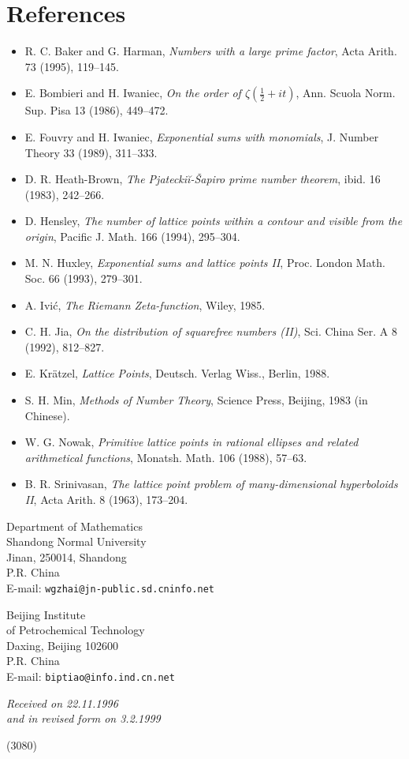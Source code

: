\documentclass[10pt]{article}
\begin{document}
\section*{References}
\begin{itemize}
  \item[] [1] R. C. Baker and G. Harman, \textit{Numbers with a large prime factor}, Acta Arith. 73 (1995), 119--145.
  \item[] [2] E. Bombieri and H. Iwaniec, \textit{On the order of $\zeta\left(\frac{1}{2}+i t\right)$}, Ann. Scuola Norm. Sup. Pisa 13 (1986), 449--472.
  \item[] [3] E. Fouvry and H. Iwaniec, \textit{Exponential sums with monomials}, J. Number Theory 33 (1989), 311--333.
  \item[] [4] D. R. Heath-Brown, \textit{The Pjateckiĭ-Šapiro prime number theorem}, ibid. 16 (1983), 242--266.
  \item[] [5] D. Hensley, \textit{The number of lattice points within a contour and visible from the origin}, Pacific J. Math. 166 (1994), 295--304.
  \item[] [6] M. N. Huxley, \textit{Exponential sums and lattice points II}, Proc. London Math. Soc. 66 (1993), 279--301.
  \item[] [7] A. Ivić, \textit{The Riemann Zeta-function}, Wiley, 1985.
  \item[] [8] C. H. Jia, \textit{On the distribution of squarefree numbers (II)}, Sci. China Ser. A 8 (1992), 812--827.
  \item[] [9] E. Krätzel, \textit{Lattice Points}, Deutsch. Verlag Wiss., Berlin, 1988.
  \item[] [10] S. H. Min, \textit{Methods of Number Theory}, Science Press, Beijing, 1983 (in Chinese).
  \item[] [11] W. G. Nowak, \textit{Primitive lattice points in rational ellipses and related arithmetical functions}, Monatsh. Math. 106 (1988), 57--63.
  \item[] [12] B. R. Srinivasan, \textit{The lattice point problem of many-dimensional hyperboloids II}, Acta Arith. 8 (1963), 173--204.
\end{itemize}

Department of Mathematics\\
Shandong Normal University\\
Jinan, 250014, Shandong\\
P.R. China\\
E-mail: \texttt{wgzhai@jn-public.sd.cninfo.net}

Beijing Institute\\
of Petrochemical Technology\\
Daxing, Beijing 102600\\
P.R. China\\
E-mail: \texttt{biptiao@info.ind.cn.net}

\begin{center}
\textit{Received on 22.11.1996\\
and in revised form on 3.2.1999}
\end{center}
\hfill (3080)
\end{document}
